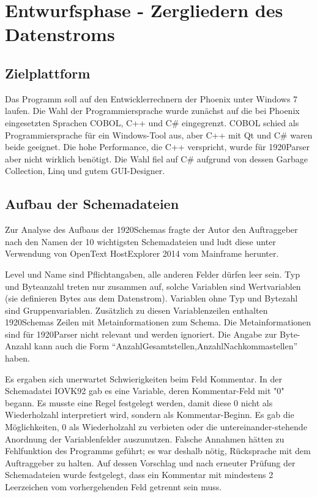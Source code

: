 \section{Entwurfsphase - Zergliedern des Datenstroms} 
\label{sec:Entwurfsphase}

\subsection{Zielplattform}
\label{sec:Zielplattform}
Das Programm soll auf den Entwicklerrechnern der Phoenix unter Windows 7 laufen. 
Die Wahl der Programmiersprache wurde zunächst auf die bei Phoenix eingesetzten Sprachen COBOL, C++ und C\# eingegrenzt. COBOL schied als Programmiersprache für ein Windows-Tool aus,  aber C++ mit Qt und C\# waren beide geeignet. Die hohe Performance, die C++ verspricht, wurde für 1920Parser aber nicht wirklich benötigt. Die Wahl fiel auf C\# aufgrund von dessen Garbage Collection, \ac{Linq} und gutem GUI-Designer.

\subsection{Aufbau der Schemadateien}
\label{sec:AufbauSchemas}
Zur Analyse des Aufbaus der 1920Schemas fragte der Autor den Auftraggeber nach den Namen der 10 wichtigsten Schemadateien und ludt diese unter Verwendung von OpenText HostExplorer 2014 vom Mainframe herunter.

Level und Name sind Pflichtangaben, alle anderen Felder dürfen leer sein. Typ und Byteanzahl treten nur zusammen auf, solche Variablen sind Wertvariablen (sie definieren Bytes aus dem Datenstrom).
Variablen ohne Typ und Bytezahl sind Gruppenvariablen.
Zusätzlich zu diesen Variablenzeilen enthalten 1920Schemas Zeilen mit Metainformationen zum Schema. Die Metainformationen sind für 1920Parser nicht relevant und werden ignoriert.
Die Angabe zur Byte-Anzahl kann auch die Form ``AnzahlGesamtstellen,AnzahlNachkommastellen'' haben.

Es ergaben sich unerwartet Schwierigkeiten beim Feld Kommentar. In der Schemadatei IOVK92 gab es eine Variable, deren Kommentar-Feld mit "0" begann. Es musste eine Regel festgelegt werden, damit diese 0 nicht als Wiederholzahl interpretiert wird, sondern als Kommentar-Beginn. Es gab die Möglichkeiten, 0 als Wiederholzahl zu verbieten oder die untereinander-stehende Anordnung der Variablenfelder auszunutzen. Falsche Annahmen hätten zu Fehlfunktion des Programms geführt; es war deshalb nötig, Rücksprache mit dem Auftraggeber zu halten. Auf dessen Vorschlag und nach erneuter Prüfung der Schemadateien wurde festgelegt, dass ein Kommentar mit mindestens 2 Leerzeichen vom vorhergehenden Feld getrennt sein muss.

